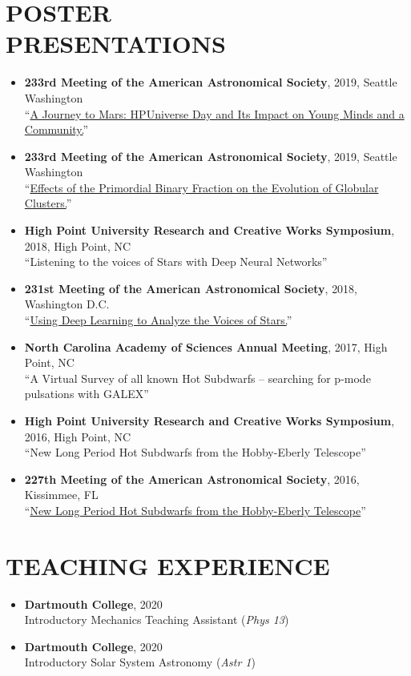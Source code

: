\documentclass[margin, 10pt]{res} %
\begin{document}
\begin{resume}
\section{POSTER\\PRESENTATIONS}
\begin{itemize}
\item {\scriptsize \textbf{233rd Meeting of the American Astronomical Society}}, {\small 2019, Seattle Washington}\\ ``\href{https://ui.adsabs.harvard.edu/#abs/2019AAS...23314705C/abstract}{A Journey to Mars: HPUniverse Day and Its Impact on Young Minds and a Community.}''
\item {\scriptsize \textbf{233rd Meeting of the American Astronomical Society}}, {\small 2019, Seattle Washington}\\ ``\href{https://ui.adsabs.harvard.edu/#abs/2019AAS...23324909B/abstract}{Effects of the Primordial Binary Fraction on the Evolution of Globular Clusters.}''
\item {\scriptsize \textbf{High Point University Research and Creative Works Symposium}}, {\small 2018, High Point, NC}\\ ``Listening to the voices of Stars with Deep Neural Networks''
\item \textbf{{\scriptsize 231st Meeting of the American Astronomical Society}}, {\small 2018, Washington D.C.}\\``\href{https://ui.adsabs.harvard.edu/#abs/2018AAS...23115029B/abstract}{Using Deep Learning to Analyze the Voices of Stars.}''
\item \textbf{{\scriptsize North Carolina Academy of Sciences Annual Meeting}}, {\small 2017, High Point, NC}\\ ``A Virtual Survey of all known Hot Subdwarfs -- searching for p-mode pulsations with GALEX''
\item {\scriptsize \textbf{High Point University Research and Creative Works Symposium}}, {\small 2016, High Point, NC}\\``New Long Period Hot Subdwarfs from the Hobby-Eberly Telescope''
\item \textbf{{\scriptsize 227th Meeting of the American Astronomical Society}}, {\small 2016, Kissimmee, FL}\\``\href{https://ui.adsabs.harvard.edu/#abs/2016AAS...22734412B/abstract}{New Long Period Hot Subdwarfs from the Hobby-Eberly Telescope}''
\end{itemize}

\section{TEACHING EXPERIENCE}
\begin{itemize}
	\item {\scriptsize \textbf{Dartmouth College}}, {\small 2020} \\ Introductory Mechanics Teaching Assistant (\textit{Phys 13})
	\item {\scriptsize \textbf{Dartmouth College}}, {\small 2020} \\ Introductory Solar System Astronomy (\textit{Astr 1})
\end{itemize}


\end{resume}
\end{document}
